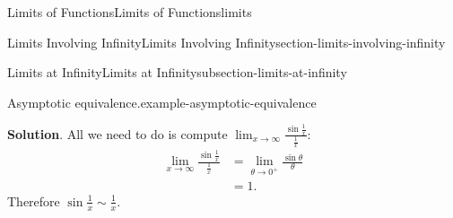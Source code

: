 \documentclass[oneside,10pt,]{book}
\numberwithin{equation}{section}
\begin{document}
\begin{chapterptx}{Limits of Functions}{}{Limits of Functions}{}{}{limits}
\begin{sectionptx}{Limits Involving Infinity}{}{Limits Involving Infinity}{}{}{section-limits-involving-infinity}
\begin{subsectionptx}{Limits at Infinity}{}{Limits at Infinity}{}{}{subsection-limits-at-infinity}
\begin{example}{Asymptotic equivalence.}{example-asymptotic-equivalence}
\par\smallskip%
\noindent\textbf{Solution}.\hypertarget{solution-15}{}\quad%
\hypertarget{p-73}{}%
All we need to do is compute \(\lim_{x\to\infty}\frac{\sin\frac{1}{x}}{\frac{1}{x}}:\)%
\begin{align*}
\lim_{x\to\infty}\frac{\sin\frac{1}{x}}{\frac{1}{x}} & = \lim_{\theta\to0^{+}}\frac{\sin\theta}{\theta} \\
& = 1. 
\end{align*}
Therefore \(\sin\frac{1}{x}\sim\frac{1}{x}\).%
\end{example}
\end{subsectionptx}
\end{sectionptx}
\end{chapterptx}
%
%
\typeout{************************************************}
\typeout{************************************************}
%
\end{document}
